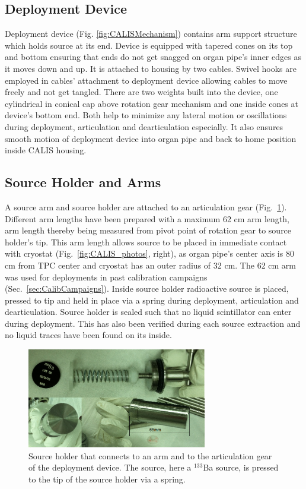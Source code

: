 \subsection{Deployment Device}
Deployment device (Fig. \ref{fig:CALISMechanism}) contains arm support structure which holds source at its end. Device is equipped with tapered cones on its top and bottom ensuring that ends do not get snagged on organ pipe's inner edges as it moves down and up. It is attached to housing by two cables.  Swivel hooks are employed in cables' attachment to deployment device allowing cables to move freely and not get tangled. 
There are two weights built into the device, one cylindrical in conical cap above rotation gear mechanism and one inside cones at device's bottom end. Both help to minimize any lateral motion or oscillations during deployment, articulation and dearticulation especially. It also ensures smooth motion of deployment device into organ pipe and back to home position inside CALIS housing.

\subsection{Source Holder and Arms}
A source arm and source holder are attached to an articulation gear (Fig.~\ref{fig:SourceHolder}). Different arm lengths have been prepared with a maximum 62 cm arm length, arm length thereby being measured from pivot point of rotation gear to source holder's tip. This arm length allows source to be placed in immediate contact with cryostat (Fig.~\ref{fig:CALIS_photos}, right), as organ pipe's center axis is 80 cm from TPC center and cryostat has an outer radius of 32 cm. The 62 cm arm was used for deployments in past calibration campaigns (Sec.~\ref{sec:CalibCampaigns}). Inside source holder radioactive source is placed, pressed to tip and held in place via a spring during deployment, articulation and dearticulation. Source holder is sealed such that no liquid scintillator can enter during deployment. This has also been verified during each source extraction and no liquid traces have been found on its inside.

\begin{figure}[htbp]
 \centering
  \includegraphics[width=0.7\textwidth]{Figures/SourceHolder.png}
  \caption{Source holder that connects to an arm and to the articulation gear of the deployment device. The source, here a $^{133}$Ba source, is pressed to the tip of the source holder via a spring.}
  \label{fig:SourceHolder}
\end{figure}